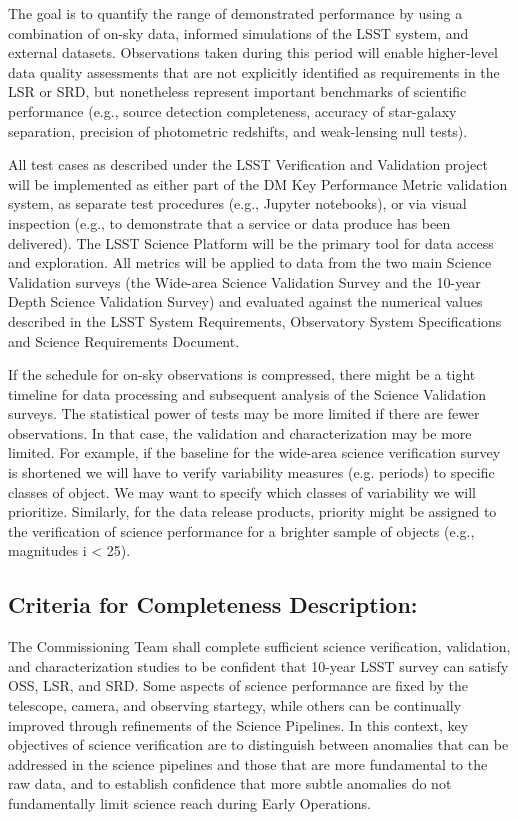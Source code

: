 The goal is to quantify the range of demonstrated performance by using a combination of on-sky data, informed simulations of the LSST system, and external datasets. Observations taken during this period will enable higher-level data quality assessments that are not explicitly identified as requirements in the LSR or SRD, but nonetheless represent important benchmarks of scientific performance (e.g., source detection completeness, accuracy of star-galaxy separation, precision of photometric redshifts, and weak-lensing null tests). 

All test cases as described under the LSST Verification and Validation  project will be implemented as either part of the DM Key Performance Metric validation system, as separate test procedures (e.g., Jupyter notebooks), or via visual inspection (e.g., to demonstrate that a service or data produce has been delivered). The LSST Science Platform will be the primary tool for data access and exploration. All metrics will be applied to data from the two main Science Validation surveys (the Wide-area Science Validation Survey and the 10-year Depth Science Validation Survey) and evaluated against the numerical values described in the LSST System Requirements, Observatory System Specifications and Science Requirements Document.

If the schedule for on-sky observations is compressed, there might be a tight timeline for data processing and subsequent analysis of the Science Validation surveys. The statistical power of tests may be more limited if there are fewer observations. In that case, the validation and characterization may be more limited. For example, if the baseline for the wide-area science verification survey is shortened we will have to verify variability measures (e.g. periods) to specific classes of object. We may want to specify which classes of variability we will prioritize. Similarly, for the data release products, priority might be assigned to the verification of science performance for a brighter sample of objects (e.g., magnitudes i < 25).

\subsection{Criteria for Completeness Description:}

The Commissioning Team shall complete sufficient science verification, validation, and characterization studies to be confident that 10-year LSST survey can satisfy OSS, LSR, and SRD. Some aspects of science performance are fixed by the telescope, camera, and observing startegy, while others can be continually improved through refinements of the Science Pipelines. In this context, key objectives of science verification are to distinguish between anomalies that can be addressed in the science pipelines and those that are more fundamental to the raw data, and to establish confidence that more subtle anomalies do not fundamentally limit science reach during Early Operations.

